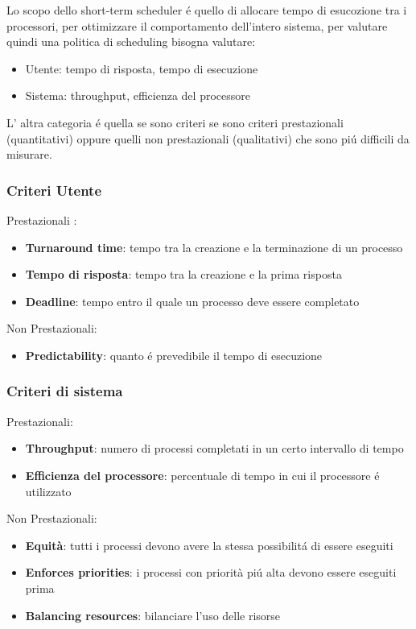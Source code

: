     Lo scopo dello short-term scheduler é quello di allocare tempo di esucozione tra i processori, per ottimizzare
    il comportamento dell'intero sistema, per valutare quindi una politica di scheduling bisogna valutare:
    \begin{itemize}
        \item Utente: tempo di risposta, tempo di esecuzione
        \item Sistema: throughput, efficienza del processore
    \end{itemize}
    L' altra categoria é quella se sono criteri se sono criteri prestazionali (quantitativi) oppure quelli non
    prestazionali (qualitativi) che sono piú difficili da misurare.
    \subsubsection{Criteri Utente}
    Prestazionali :
        \begin{itemize}
        \item   \textbf{Turnaround time}: tempo tra la creazione e la terminazione di un processo
        \item  \textbf{Tempo di risposta}: tempo tra la creazione e la prima risposta
        \item  \textbf{Deadline}: tempo entro il quale un processo deve essere completato
    \end{itemize}
    Non Prestazionali:
    \begin{itemize}
        \item \textbf{Predictability}: quanto é prevedibile il tempo di esecuzione
    \end{itemize}
    \subsubsection{Criteri di sistema}
    Prestazionali:
    \begin{itemize}
        \item \textbf{Throughput}: numero di processi completati in un certo intervallo di tempo
        \item \textbf{Efficienza del processore}: percentuale di tempo in cui il processore é utilizzato
    \end{itemize}
    Non Prestazionali:
    \begin{itemize}
        \item \textbf{Equità}: tutti i processi devono avere la stessa possibilitá di essere eseguiti
        \item \textbf{Enforces priorities}: i processi con priorità piú alta devono essere eseguiti prima
        \item \textbf{Balancing resources}: bilanciare l'uso delle risorse
        \end{itemize}
